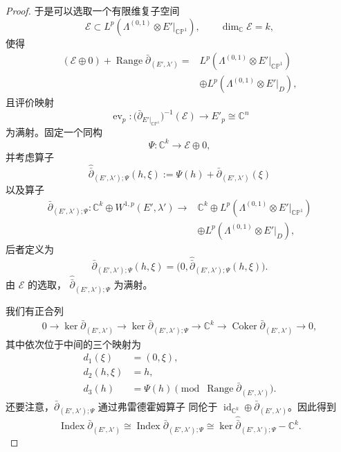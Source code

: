 \begin{proof}
于是可以选取一个有限维复子空间
\[
\mathcal E\subset
L^p(\Lambda^{(0,1)}\otimes E'|_{\mathbb{CP}^1}),
\qquad \dim_{\mathbb C}\mathcal E=k,
\]
使得
\[
\begin{split}
(\mathcal E\oplus0)+\operatorname{Range}
 \bar\partial_{(E',\lambda')}
={}&L^p(\Lambda^{(0,1)}\otimes E'|_{\mathbb{CP}^1})\\
&\oplus L^p(\Lambda^{(0,1)}\otimes E'|_D),
\end{split}
\]
且评价映射
\[
\operatorname{ev}_p\colon
\bigl(\bar\partial_{E'|_{\mathbb{CP}^1}}\bigr)^{-1}(\mathcal E)
\longrightarrow E'_p\cong\mathbb C^n
\]
为满射。固定一个同构
\[
\Psi\colon\mathbb C^k\longrightarrow\mathcal E\oplus0,
\]
并考虑算子
\[
\widehat{\bar\partial}_{(E',\lambda');\Psi}(h,\xi)
:=\Psi(h)+\bar\partial_{(E',\lambda')}(\xi)
\]
以及算子
\[
\begin{split}
\bar\partial_{(E',\lambda');\Psi}\colon
\mathbb C^k\oplus W^{1,p}(E',\lambda')
\longrightarrow{}&\mathbb C^k\oplus
L^p(\Lambda^{(0,1)}\otimes E'|_{\mathbb{CP}^1})\\
&\oplus L^p(\Lambda^{(0,1)}\otimes E'|_D),
\end{split}
\]
后者定义为
\[
\bar\partial_{(E',\lambda');\Psi}(h,\xi)
=\bigl(0,\widehat{\bar\partial}_{(E',\lambda');\Psi}(h,\xi)\bigr).
\]
由 $\mathcal E$ 的选取，
$\widehat{\bar\partial}_{(E',\lambda');\Psi}$ 为满射。

我们有正合列
\[
\begin{split}
0\longrightarrow\ker\bar\partial_{(E',\lambda')}
\longrightarrow\ker\bar\partial_{(E',\lambda');\Psi}
\longrightarrow\mathbb C^k
\longrightarrow\operatorname{Coker}\bar\partial_{(E',\lambda')}
\longrightarrow0,
\end{split}
\]
其中依次位于中间的三个映射为
\[
\begin{split}
d_1(\xi)&=(0,\xi),\\
d_2(h,\xi)&=h,\\
d_3(h)&=\Psi(h)\pmod{\operatorname{Range}\bar\partial_{(E',\lambda')}}.
\end{split}
\]
还要注意，$\bar\partial_{(E',\lambda');\Psi}$ 通过弗雷德霍姆算子
同伦于 $\operatorname{id}_{\mathbb C^k}\oplus
\bar\partial_{(E',\lambda')}$。因此得到
\begin{equation}
\operatorname{Index}\bar\partial_{(E',\lambda')}
\cong\operatorname{Index}\bar\partial_{(E',\lambda');\Psi}
\cong\ker\widehat{\bar\partial}_{(E',\lambda');\Psi}-\mathbb C^k.
\tag{*}\label{eq:8-1-star}
\end{equation}


\end{proof}
